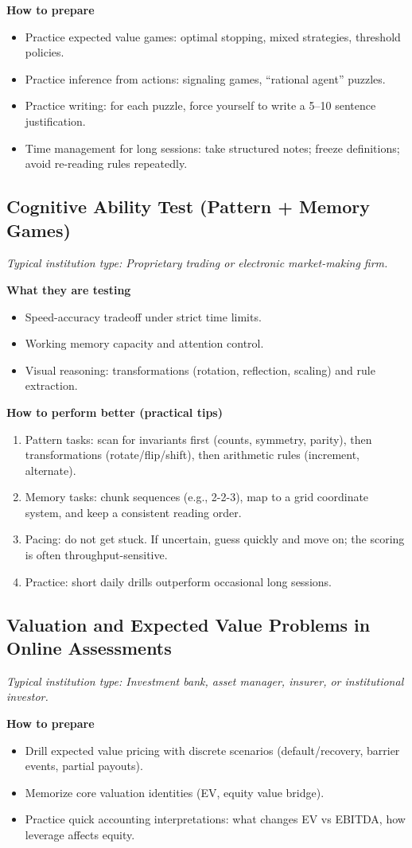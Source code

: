 \documentclass[11pt,letterpaper,openany]{book}
\newcommand{\RoleProfile}[2]{%
  \subsection{#1}%
  \noindent\textit{Typical institution type: #2.}\par
}
\begin{document}
\textbf{How to prepare}
\begin{itemize}
  \item Practice expected value games: optimal stopping, mixed strategies, threshold policies.
  \item Practice inference from actions: signaling games, ``rational agent'' puzzles.
  \item Practice writing: for each puzzle, force yourself to write a 5--10 sentence justification.
  \item Time management for long sessions: take structured notes; freeze definitions; avoid re-reading rules repeatedly.
\end{itemize}

\RoleProfile{Cognitive Ability Test (Pattern + Memory Games)}{Proprietary trading or electronic market-making firm}
\textbf{What they are testing}
\begin{itemize}
  \item Speed-accuracy tradeoff under strict time limits.
  \item Working memory capacity and attention control.
  \item Visual reasoning: transformations (rotation, reflection, scaling) and rule extraction.
\end{itemize}

\textbf{How to perform better (practical tips)}
\begin{enumerate}
  \item Pattern tasks: scan for invariants first (counts, symmetry, parity), then transformations (rotate/flip/shift), then arithmetic rules (increment, alternate).
  \item Memory tasks: chunk sequences (e.g., 2-2-3), map to a grid coordinate system, and keep a consistent reading order.
  \item Pacing: do not get stuck. If uncertain, guess quickly and move on; the scoring is often throughput-sensitive.
  \item Practice: short daily drills outperform occasional long sessions.
\end{enumerate}

\RoleProfile{Valuation and Expected Value Problems in Online Assessments}{Investment bank, asset manager, insurer, or institutional investor}
\textbf{How to prepare}
\begin{itemize}
  \item Drill expected value pricing with discrete scenarios (default/recovery, barrier events, partial payouts).
  \item Memorize core valuation identities (EV, equity value bridge).
  \item Practice quick accounting interpretations: what changes EV vs EBITDA, how leverage affects equity.
\end{itemize}
\end{document}
